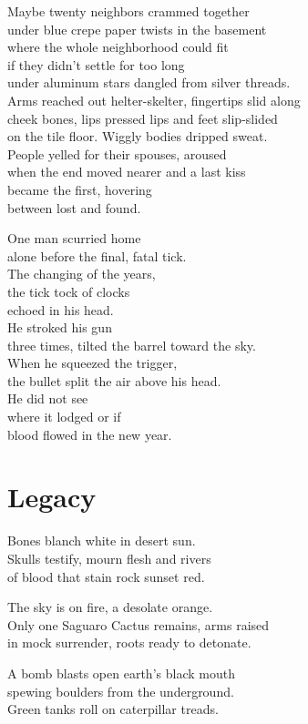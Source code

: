 \documentclass[twoside,10pt]{book}
\begin{document}
Maybe twenty neighbors crammed together\\
under blue crepe paper twists in the basement\\
where the whole neighborhood could fit\\
if they didn't settle for too long\\
under aluminum stars dangled from silver threads.\\
Arms reached out helter-skelter, fingertips slid along\\
cheek bones, lips pressed lips and feet slip-slided\\
on the tile floor. Wiggly bodies dripped sweat.\\
People yelled for their spouses, aroused\\
when the end moved nearer and a last kiss\\
became the first, hovering\\
between lost and found.

One man scurried home\\
alone before the final, fatal tick.\\
The changing of the years,\\
the tick tock of clocks\\
echoed in his head.\\
He stroked his gun\\
three times, tilted the barrel toward the sky.\\
When he squeezed the trigger,\\
the bullet split the air above his head.\\
He did not see\\
where it lodged or if\\
blood flowed in the new year.


\clearpage
\section{Legacy}

Bones blanch white in desert sun.\\
Skulls testify, mourn flesh and rivers\\
of blood that stain rock sunset red.

The sky is on fire, a desolate orange.\\
Only one Saguaro Cactus remains, arms raised\\
in mock surrender, roots ready to detonate.

A bomb blasts open earth's black mouth\\
spewing boulders from the underground.\\
Green tanks roll on caterpillar treads.
\end{document}
